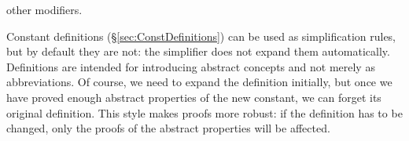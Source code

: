 \begin{isabellebody}
\begin{isamarkuptext}
other modifiers.
\end{isamarkuptext}%
\isamarkuptrue%
%
\isamarkuptrue%
%
\begin{isamarkuptext}%
\label{sec:Simp-with-Defs}
Constant definitions (\S\ref{sec:ConstDefinitions}) can be used as
simplification rules, but by default they are not: the simplifier does not
expand them automatically.  Definitions are intended for introducing abstract
concepts and not merely as abbreviations.  Of course, we need to expand
the definition initially, but once we have proved enough abstract properties
of the new constant, we can forget its original definition.  This style makes
proofs more robust: if the definition has to be changed,
only the proofs of the abstract properties will be affected.


\end{isamarkuptext}
\end{isabellebody}

